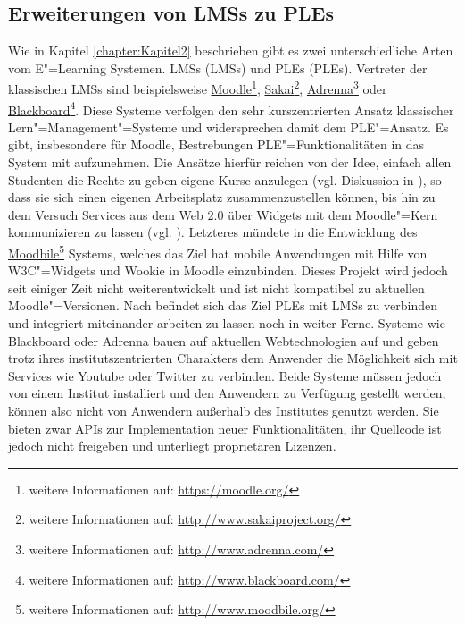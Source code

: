 \subsection{Erweiterungen von \acp{LMS} zu \acp{PLE}}
Wie in Kapitel \ref{chapter:Kapitel2} beschrieben gibt es zwei unterschiedliche Arten vom E"=Learning Systemen. \aclp{LMS} (\acp{LMS}) und \aclp{PLE} (\acp{PLE}). Vertreter der klassischen \acp{LMS} sind beispielsweise \href{https://moodle.org/}{Moodle}\footnote{weitere Informationen auf: \url{https://moodle.org/}}, \href{http://www.sakaiproject.org/}{Sakai}\footnote{weitere Informationen auf: \url{http://www.sakaiproject.org/}}, \href{http://www.adrenna.com/}{Adrenna}\footnote{weitere Informationen auf: \url{http://www.adrenna.com/}} oder \href{http://www.blackboard.com/}{Blackboard}\footnote{weitere Informationen auf: \url{http://www.blackboard.com/}}. Diese Systeme verfolgen den sehr kurszentrierten Ansatz klassischer Lern"=Management"=Systeme und widersprechen damit dem \ac{PLE}"=Ansatz. Es gibt, insbesondere für Moodle, Bestrebungen \ac{PLE}"=Funktionalitäten in das System mit aufzunehmen. Die Ansätze hierfür reichen von der Idee, einfach allen Studenten die Rechte zu geben eigene Kurse anzulegen (vgl. Diskussion in \cite{MoodleForum2009}), so dass sie sich einen eigenen Arbeitsplatz zusammenzustellen können, bis hin zu dem Versuch Services aus dem Web 2.0 über Widgets mit dem Moodle"=Kern kommunizieren zu lassen (vgl. \cite{Penalvo2011}). Letzteres mündete in die Entwicklung des \href{http://www.moodbile.org/}{Moodbile}\footnote{weitere Informationen auf: \url{http://www.moodbile.org/}} Systems, welches das Ziel hat mobile Anwendungen mit Hilfe von \ac{W3C}"=Widgets und Wookie in Moodle einzubinden. Dieses Projekt wird jedoch seit einiger Zeit nicht weiterentwickelt und ist nicht kompatibel zu aktuellen Moodle"=Versionen. Nach \cite{Penalvo2011} befindet sich das Ziel \acp{PLE} mit \acp{LMS} zu verbinden und integriert miteinander arbeiten zu lassen noch in weiter Ferne. Systeme wie Blackboard oder Adrenna bauen auf aktuellen Webtechnologien auf und geben trotz ihres institutszentrierten Charakters dem Anwender die Möglichkeit sich mit Services wie Youtube oder Twitter zu verbinden. Beide Systeme müssen jedoch von einem Institut installiert und den Anwendern zu Verfügung gestellt werden, können also nicht von Anwendern außerhalb des Institutes genutzt werden. Sie bieten zwar \acp{API} zur Implementation neuer Funktionalitäten, ihr Quellcode ist jedoch nicht freigeben und unterliegt proprietären Lizenzen.

